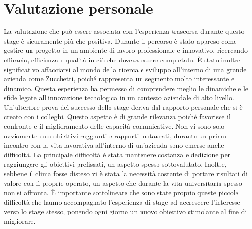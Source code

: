     \section{Valutazione personale}
    La valutazione che può essere associata con l'esperienza trascorsa durante questo stage è sicuramente più che positiva.
    Durante il percorso è stato appreso come gestire un progetto in un ambiente di lavoro professionale e innovativo, ricercando efficacia, efficienza e qualità in ciò che doveva essere completato.
    È stato inoltre significativo affacciarsi al mondo della ricerca e sviluppo all'interno di una grande azienda come Zucchetti, poiché rappresenta un segmento molto interessante e dinamico. Questa esperienza ha permesso di comprendere meglio le dinamiche e le sfide legate all'innovazione tecnologica in un contesto aziendale di alto livello.
    Un'ulteriore prova del successo dello stage deriva dal rapporto personale che si è creato con i colleghi. Questo aspetto è di grande rilevanza poiché favorisce il confronto e il miglioramento delle capacità comunicative.
    Non vi sono solo ovviamente solo obiettivi raggiunti e rapporti instaurati, durante un primo incontro con la vita lavorativa all'interno di un'azienda sono emerse anche difficoltà. 
     La principale difficoltà è stata mantenere costanza e dedizione per raggiungere gli obiettivi prefissati, un aspetto spesso sottovalutato.
     Inoltre, sebbene il clima fosse disteso vi è stata la necessità costante di portare risultati di valore con il proprio operato, un aspetto che durante la vita universitaria spesso non si affronta.
    È importante sottolineare che sono state proprio queste piccole difficoltà che hanno accompagnato l'esperienza di stage ad accrescere l'interesse verso lo stage stesso, ponendo ogni giorno un nuovo obiettivo stimolante al fine di migliorare.

\newpage